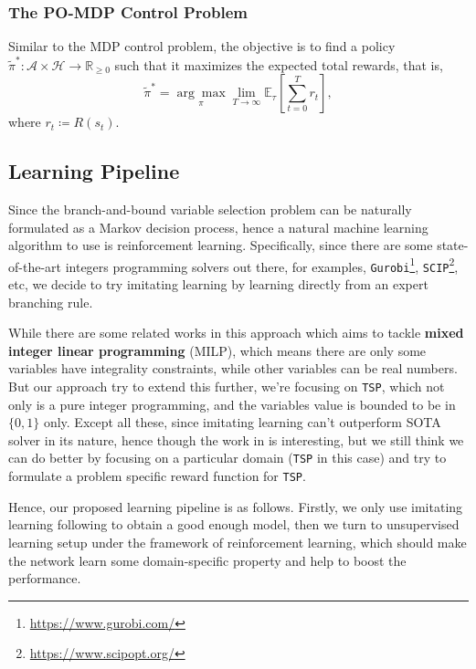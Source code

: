 \documentclass{article}
\begin{document}
\subsubsection{The PO-MDP Control Problem}
Similar to the MDP control problem, the objective is to find a policy \(\widetilde{\pi}^\ast\colon \mathcal{A}\times \mathcal{H}\to \mathbb{R}_{\geq 0}\) such that
it maximizes the expected total rewards, that is,
\[
	\widetilde{\pi}^\ast = \underset{\pi}{\arg\max} \lim_{T\to \infty}\mathbb{E}_\tau\left[\sum_{t=0}^T r_t\right],
\]
where \(r_t\coloneqq R(s_t)\).

\subsection{Learning Pipeline}
Since the branch-and-bound variable selection problem can be naturally formulated as a Markov decision process, hence a natural machine learning algorithm to use is reinforcement learning. \cite{sutton2018reinforcement}
Specifically, since there are some state-of-the-art integers programming solvers out there, for examples, \texttt{Gurobi}\footnote{\url{https://www.gurobi.com/}}, \texttt{SCIP}\footnote{\url{https://www.scipopt.org/}}, etc,
we decide to try imitating learning\cite{Imitation-Learning-A-Survey-of-Learning-Methods} by learning directly from an expert branching rule.

While there are some related works in this approach \cite{GasseCFCL19} which aims to tackle \textbf{mixed integer linear programming} (MILP), which means there are only some variables have integrality constraints, while
other variables can be real numbers. But our approach try to extend this further, we're focusing on \texttt{TSP}, which not only is a pure integer programming, and the variables value is bounded to be in \(\{0, 1\}\) only.
Except all these, since imitating learning can't outperform SOTA solver in its nature, hence though the work in \cite{GasseCFCL19} is interesting, but we still think we can do better by focusing on a particular domain (\texttt{TSP}
in this case) and try to formulate a problem specific reward function for \texttt{TSP}.

Hence, our proposed learning pipeline is as follows. Firstly, we only use imitating learning following \cite{GasseCFCL19} to obtain a good enough model, then we turn to unsupervised learning setup under the framework of
reinforcement learning, which should make the network learn some domain-specific property and help to boost the performance.
\end{document}
